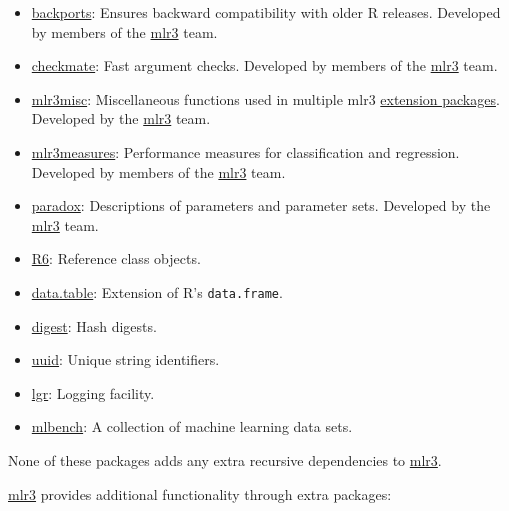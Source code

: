 \documentclass[]{scrbook}
\providecommand{\tightlist}{%
  \setlength{\itemsep}{0pt}\setlength{\parskip}{0pt}}
\begin{document}
\begin{itemize}
\tightlist
\item
  \href{https://cran.r-project.org/package=backports}{backports}:
  Ensures backward compatibility with older R releases. Developed by members of the \href{https://mlr3.mlr-org.com}{mlr3} team.
\item
  \href{https://cran.r-project.org/package=checkmate}{checkmate}:
  Fast argument checks. Developed by members of the \href{https://mlr3.mlr-org.com}{mlr3} team.
\item
  \href{https://cran.r-project.org/package=mlr3misc}{mlr3misc}:
  Miscellaneous functions used in multiple mlr3 \href{https://github.com/mlr-org/mlr3/wiki/Extension-Packages}{extension packages}.
  Developed by the \href{https://mlr3.mlr-org.com}{mlr3} team.
\item
  \href{https://cran.r-project.org/package=mlr3measures}{mlr3measures}:
  Performance measures for classification and regression. Developed by members of the \href{https://mlr3.mlr-org.com}{mlr3} team.
\item
  \href{https://cran.r-project.org/package=paradox}{paradox}:
  Descriptions of parameters and parameter sets. Developed by the \href{https://mlr3.mlr-org.com}{mlr3} team.
\item
  \href{https://cran.r-project.org/package=R6}{R6}:
  Reference class objects.
\item
  \href{https://cran.r-project.org/package=data.table}{data.table}:
  Extension of R's \texttt{data.frame}.
\item
  \href{https://cran.r-project.org/package=digest}{digest}:
  Hash digests.
\item
  \href{https://cran.r-project.org/package=uuid}{uuid}:
  Unique string identifiers.
\item
  \href{https://cran.r-project.org/package=lgr}{lgr}:
  Logging facility.
\item
  \href{https://cran.r-project.org/package=mlbench}{mlbench}:
  A collection of machine learning data sets.
\end{itemize}

None of these packages adds any extra recursive dependencies to \href{https://mlr3.mlr-org.com}{mlr3}.

\href{https://mlr3.mlr-org.com}{mlr3} provides additional functionality through extra packages:
\end{document}
